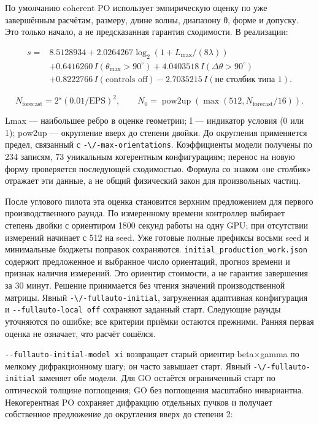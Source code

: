 По умолчанию coherent PO использует эмпирическую оценку по уже
завершённым расчётам, размеру, длине волны, диапазону θ, форме и
допуску. Это только начало, а не предсказанная гарантия сходимости. В
реализации:

\[\begin{aligned}
s={}&8.5128934+2.0264267\log_2(1+L_{\max}/(8\lambda))\\
&+0.6416260\,I(\theta_{\max}>90^\circ)
+4.0403518\,I(\Delta\theta>90^\circ)\\
&+0.8222766\,I(\text{controls off})
-2.7035215\,I(\text{не столбик типа 1}).
\end{aligned}\]

\[N_{\mathrm{forecast}}=2^s(0.01/\mathrm{EPS})^2,\qquad
N_0=\operatorname{pow2up}\!\left(\max(512,N_{\mathrm{forecast}}/16)\right).\]

Lmax --- наибольшее ребро в оценке геометрии; I --- индикатор условия (0
или 1); pow2up --- округление вверх до степени двойки. До округления
применяется предел, связанный с \nolinkurl{-\/-max-orientations}.
Коэффициенты модели получены по 234 записям, 73 уникальным когерентным
конфигурациям; перенос на новую форму проверяется последующей
сходимостью. Формула со знаком «не столбик» отражает эти данные, а не
общий физический закон для произвольных частиц.

После углового пилота эта оценка становится верхним предложением для
первого производственного раунда. По измеренному времени контроллер
выбирает степень двойки с ориентиром 1800 секунд работы на одну GPU; при
отсутствии измерений начинает с 512 на seed. Уже готовые полные префиксы
восьми seed и минимальные бюджеты поправок сохраняются.
\nolinkurl{initial_production_work.json} содержит предложенное и
выбранное число ориентаций, прогноз времени и признак наличия измерений.
Это ориентир стоимости, а не гарантия завершения за 30 минут. Решение
принимается без чтения значений производственной матрицы. Явный
\nolinkurl{-\/-fullauto-initial}, загруженная адаптивная конфигурация и
\texttt{-\/-fullauto-local\ off} сохраняют заданный старт. Следующие
раунды уточняются по ошибке; все критерии приёмки остаются прежними.
Ранняя первая оценка не означает, что расчёт сошёлся.

\texttt{-\/-fullauto-initial-model\ xi} возвращает старый ориентир
beta×gamma по мелкому дифракционному шагу; он часто завышает старт.
Явный \nolinkurl{-\/-fullauto-initial} заменяет обе модели. Для GO остаётся
ограниченный старт по оптической толщине поглощения; GO без поглощения
масштабно инвариантна. Некогерентная PO сохраняет дифракцию отдельных
пучков и получает собственное предложение до округления вверх до степени
2:

